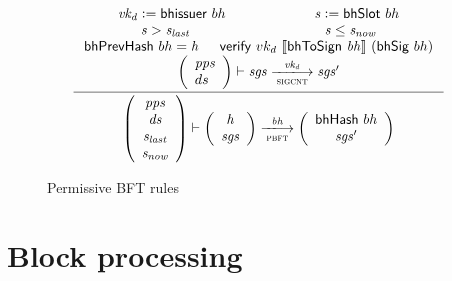 \documentclass[11pt,a4paper]{article}
\newcommand{\var}[1]{\mathit{#1}}
\newcommand{\fun}[1]{\mathsf{#1}}
\newcommand{\type}[1]{\mathsf{#1}}
\newcommand{\trans}[2]{\xlongrightarrow[\textsc{#1}]{#2}}
\newcommand{\serialised}[1]{\llbracket \var{#1} \rrbracket}
\newcommand{\leteq}{\ensuremath{\mathrel{\mathop:}=}}
\newcommand{\verifyname}{verify}
\newcommand{\bhsigname}{bhSig}
\newcommand{\bhissuername}{bhissuer}
\newcommand{\verify}[3]{\fun{\verifyname} ~ #1 ~ #2 ~ #3}
\newcommand{\bhsig}[1]{\fun{\bhsigname} ~ #1}
\newcommand{\bhissuer}[1]{\fun{\bhissuername} ~ #1}
\begin{document}
\begin{figure}[ht]
  \begin{equation*}
    \inference
    {
      \var{vk_d} \leteq \bhissuer{bh} & \var{s} \leteq \bhslot{bh}
      \\ \var{s} > \var{s_{last}} & \var{s} \leq \var{s_{now}}
      \\ \bhprevhash{bh} = \var{h} & \verify{vk_d}{\serialised{\bhtosign{bh}}}{(\bhsig{bh})}
      \\
      {\left(
          \begin{array}{l}
            \var{pps} \\
            ds
          \end{array}
        \right)}
      \vdash
      \var{sgs} \trans{sigcnt}{\var{vk_d}} \var{sgs'}
      \\
    }
    {
      \left(
        {\begin{array}{c}
          \var{pps} \\
           \var{ds} \\
           \var{s_{last}} \\
           \var{s_{now}} \\
         \end{array}}
     \right)
     \vdash
     \left(
       {\begin{array}{c}
          \var{h} \\
          \var{sgs}
        \end{array}}
    \right)
    \trans{pbft}{\var{bh}}
    \left(
      {\begin{array}{c}
         \bhhash{bh} \\
         \var{sgs}'
       \end{array}}
   \right)
 }
\end{equation*}
\caption{Permissive BFT rules}
\label{fig:rules:pbft}
\end{figure}


\clearpage

\section{Block processing}
\label{sec:block-processing}

\newcommand{\BHState}{\type{BHState}}

\newcommand{\BBEnv}{\type{BBEnv}}
\newcommand{\BBState}{\type{BBState}}

\newcommand{\Bbody}{\type{BlockBody}}

\newcommand{\bheadname}{bHead}
\newcommand{\bhead}[1]{\fun{\bheadname}\ #1}
\newcommand{\bupdpayloadname}{bUpdPayload}
\newcommand{\bupdpayload}[1]{\fun{\bupdpayloadname}\ #1}
\end{document}
